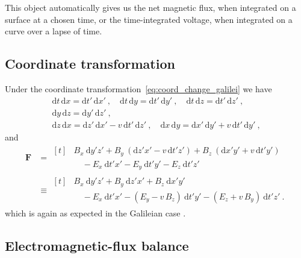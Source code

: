 \documentclass[\ifafour a4paper,12pt,\else a5paper,10pt,\fi%
onecolumn,oneside,article,%
british%
]{memoir}
\theoremstyle{remark}
\theoremstyle{innote}
\newcommand*{\di}{\mathrm{d}}%
\renewcommand*{\|}[1][]{\nonscript\:#1\vert\nonscript\:\mathopen{}}
\newcommand*{\eqn}{eq.}%
\begin{document}
This object automatically gives us the net magnetic flux, when integrated on a surface at a chosen time, or the time-integrated voltage, when integrated on a curve over a lapse of time. 

\subsection{Coordinate transformation}
\label{sec:em_coords}

Under the coordinate transformation~\eqref{eq:coord_change_galilei} we have
\begin{equation}
  \label{eq:transf_2form_galilei}
  \begin{gathered}
    \di t\,\di x = \di t'\,\di x' \ ,\quad
    \di t\,\di y = \di t'\,\di y' \ ,\quad
    \di t\,\di z = \di t'\,\di z' \ ,
    \\
    \di y\,\di z = \di y'\,\di z' \ ,\\
    \di z\,\di x = \di z'\,\di x' - v\,\di t'\,\di z'\ ,\quad
    \di x\,\di y = \di x'\,\di y' + v\,\di t'\,\di y' \ ,
  \end{gathered}
\end{equation}
and
\begin{equation}
  \label{eq:transf_faraday}
  \begin{split}
    \bm{F} &= 
    \!\begin{aligned}[t]
    &B_{x}\ \di y'z' + B_{y}\ (\di z'x' - v\,\di t'z')
    + B_{z}\ (\di x'y' + v\,\di t'y') \\
    &\quad {}- E_{x}\ \di t'x' - E_{y}\ \di t'y' - E_{z}\ \di t'z'
  \end{aligned}
  \\
    &\equiv
    \!\begin{aligned}[t]
    &B_{x}\ \di y'z' + B_{y}\ \di z'x' + B_{z}\ \di x'y' \\
    &\quad {} - E_{x}\ \di t'x' 
   - (E_{y} - v\,B_{z})\ \di t'y' - (E_{z} + v\,B_{y})\ \di t'z' \ .
  \end{aligned}
\end{split}
\end{equation}
which is again as expected in the Galileian case \autocites[\eqn~(11.3)]{kovetz2000}.

\subsection{Electromagnetic-flux balance}
\label{sec:em_balance}
\end{document}
